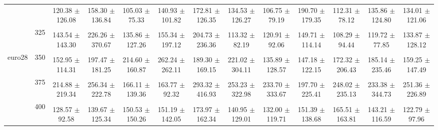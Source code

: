 \begin{table}[h]
{\begin{tabular}{
        ccccccccccccc}
 & & 120.38 $\pm$ 126.08& 158.30 $\pm$ 136.84& 105.03 $\pm$ 75.33& 140.93 $\pm$ 101.82& 172.81 $\pm$ 126.35& 134.53 $\pm$ 126.27& 106.75 $\pm$ 79.19& 190.70 $\pm$ 179.35& 112.31 $\pm$ 78.12& 135.86 $\pm$ 124.80& 134.01 $\pm$ 121.06 \\ 
 & \multirow{2}{*}{325}& \cellcolor[HTML]{EFEFEF} & \cellcolor[HTML]{EFEFEF} & \cellcolor[HTML]{EFEFEF} & \cellcolor[HTML]{EFEFEF} & \cellcolor[HTML]{EFEFEF} & \cellcolor[HTML]{EFEFEF} & \cellcolor[HTML]{EFEFEF} & \cellcolor[HTML]{EFEFEF} & \cellcolor[HTML]{EFEFEF} & \cellcolor[HTML]{EFEFEF} & \cellcolor[HTML]{EFEFEF}  \\ 
 & & \cellcolor[HTML]{EFEFEF} 143.54 $\pm$ 143.30& \cellcolor[HTML]{EFEFEF} 226.26 $\pm$ 370.67& \cellcolor[HTML]{EFEFEF} 135.86 $\pm$ 127.26& \cellcolor[HTML]{EFEFEF} 155.34 $\pm$ 197.12& \cellcolor[HTML]{EFEFEF} 204.73 $\pm$ 236.36& \cellcolor[HTML]{EFEFEF} 113.32 $\pm$ 82.19& \cellcolor[HTML]{EFEFEF} 120.91 $\pm$ 92.06& \cellcolor[HTML]{EFEFEF} 149.71 $\pm$ 114.14& \cellcolor[HTML]{EFEFEF} 108.29 $\pm$ 94.44& \cellcolor[HTML]{EFEFEF} 119.72 $\pm$ 77.85& \cellcolor[HTML]{EFEFEF} 133.87 $\pm$ 128.12 \\ 
 \multirow{4}{*}{euro28} & \multirow{2}{*}{350}& & & & & & & & & & &  \\ 
 & & 152.95 $\pm$ 114.31& 197.47 $\pm$ 181.25& 214.60 $\pm$ 160.87& 262.24 $\pm$ 262.11& 189.30 $\pm$ 169.15& 221.02 $\pm$ 304.11& 135.89 $\pm$ 128.57& 147.18 $\pm$ 122.15& 172.32 $\pm$ 206.43& 185.14 $\pm$ 235.46& 159.25 $\pm$ 147.49 \\ 
 & \multirow{2}{*}{375}& \cellcolor[HTML]{EFEFEF} & \cellcolor[HTML]{EFEFEF} & \cellcolor[HTML]{EFEFEF} & \cellcolor[HTML]{EFEFEF} & \cellcolor[HTML]{EFEFEF} & \cellcolor[HTML]{EFEFEF} & \cellcolor[HTML]{EFEFEF} & \cellcolor[HTML]{EFEFEF} & \cellcolor[HTML]{EFEFEF} & \cellcolor[HTML]{EFEFEF} & \cellcolor[HTML]{EFEFEF}  \\ 
 & & \cellcolor[HTML]{EFEFEF} 214.88 $\pm$ 219.34& \cellcolor[HTML]{EFEFEF} 256.34 $\pm$ 222.78& \cellcolor[HTML]{EFEFEF} 166.11 $\pm$ 139.36& \cellcolor[HTML]{EFEFEF} 163.77 $\pm$ 92.32& \cellcolor[HTML]{EFEFEF} 293.32 $\pm$ 416.93& \cellcolor[HTML]{EFEFEF} 253.23 $\pm$ 322.98& \cellcolor[HTML]{EFEFEF} 233.70 $\pm$ 333.67& \cellcolor[HTML]{EFEFEF} 197.70 $\pm$ 225.41& \cellcolor[HTML]{EFEFEF} 248.02 $\pm$ 235.13& \cellcolor[HTML]{EFEFEF} 233.38 $\pm$ 344.73& \cellcolor[HTML]{EFEFEF} 251.36 $\pm$ 226.89 \\ 
 & \multirow{2}{*}{400}& & & & & & & & & & &  \\ 
 & & 128.57 $\pm$ 92.58& 139.67 $\pm$ 125.34& 150.53 $\pm$ 150.26& 151.19 $\pm$ 142.05& 173.97 $\pm$ 162.34& 140.95 $\pm$ 129.01& 132.00 $\pm$ 119.71& 151.39 $\pm$ 138.68& 165.51 $\pm$ 163.81& 143.21 $\pm$ 116.59& 122.79 $\pm$ 97.96 \\ 

\end{tabular}}
\end{table}

